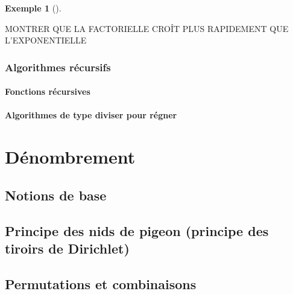 \documentclass[
  letterpaper,
]{scrbook}
\theoremstyle{plain}
\theoremstyle{definition}
\theoremstyle{definition}
\newtheorem{example}{Exemple}[chapter]
\theoremstyle{remark}
\begin{document}
\begin{example}[]\protect\hypertarget{exm-exponential-vs-factorial}{}\label{exm-exponential-vs-factorial}

MONTRER QUE LA FACTORIELLE CROÎT PLUS RAPIDEMENT QUE L'EXPONENTIELLE

\end{example}

\hypertarget{algorithmes-ruxe9cursifs}{%
\subsection{Algorithmes récursifs}\label{algorithmes-ruxe9cursifs}}

\hypertarget{fonctions-ruxe9cursives}{%
\subsubsection{Fonctions récursives}\label{fonctions-ruxe9cursives}}

\hypertarget{algorithmes-de-type-diviser-pour-ruxe9gner}{%
\subsubsection{Algorithmes de type diviser pour
régner}\label{algorithmes-de-type-diviser-pour-ruxe9gner}}


\hypertarget{duxe9nombrement}{%
\chapter{Dénombrement}\label{duxe9nombrement}}

\hypertarget{notions-de-base}{%
\section{Notions de base}\label{notions-de-base}}

\hypertarget{principe-des-nids-de-pigeon-principe-des-tiroirs-de-dirichlet}{%
\section{Principe des nids de pigeon (principe des tiroirs de
Dirichlet)}\label{principe-des-nids-de-pigeon-principe-des-tiroirs-de-dirichlet}}

\hypertarget{permutations-et-combinaisons}{%
\section{Permutations et
combinaisons}\label{permutations-et-combinaisons}}
\end{document}
